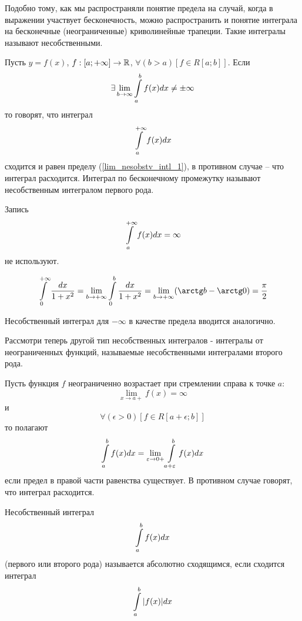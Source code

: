 Подобно тому, как мы распространяли понятие предела на случай, когда в выражении участвует бесконечность, можно распространить и понятие интеграла на бесконечные (неограниченные) криволинейные трапеции.
Такие интегралы называют несобственными.

\begin{opr}\label{opr_nesobstv_intl_1}
Пусть $y=f(x)$, $f:[a;+\infty]\to\mathbb{R}$, $\forall(b>a)[f\in R[a;b]]$.
Если 
\begin{equation}\label{lim_nesobstv_intl_1}
\exists \lim_{b\to\infty}\int\limits_a^b f(x)dx\neq \pm\infty
\end{equation}
то говорят, что интеграл
\begin{equation}\label{nesobstv_intl_1}
\int\limits_a^{+\infty}f(x)dx
\end{equation}
сходится и равен пределу (\ref{lim_nesobstv_intl_1}), в противном случае -- что интеграл расходится.
Интеграл по бесконечному промежутку называют несобственным интегралом первого рода.
\end{opr}

Запись
$$
\int\limits_a^{+\infty}f(x)dx=\infty
$$
не используют.

\begin{primer}
$$
\intl_0^{+\infty}\frac{dx}{1+x^2}=\lim_{b\to+\infty}\intl_0^{b}\frac{dx}{1+x^2}=
\lim_{b\to+\infty}(\arctg b - \arctg 0)=\frac{\pi}{2}
$$
\end{primer}

Несобственный интеграл для $-\infty$ в качестве предела вводится аналогично.

Рассмотри теперь другой тип несобственных интегралов - интегралы от неограниченных функций, называемые несобственными интегралами второго рода.

\begin{opr}
Пусть функция $f$ неограниченно возрастает при стремлении справа к точке $a$:
$$
\lim_{x\to a +}f(x)=\infty
$$
и
$$
\forall(\epsilon>0)[f\in R[a+\epsilon;b]]
$$
то полагают
$$
\int\limits_a^bf(x)dx=\lim_{\varepsilon\to 0+}\int\limits_{a+\varepsilon}^b f(x)dx
$$
если предел в правой части равенства существует.
В противном случае говорят, что интеграл расходится.
\end{opr}

\begin{opr}
Несобственный интеграл
$$
\int\limits_a^b f(x) dx
$$
(первого или второго рода) называется абсолютно сходящимся, если сходится интеграл
$$
\int\limits_a^b |f(x)| dx
$$

\end{opr}

